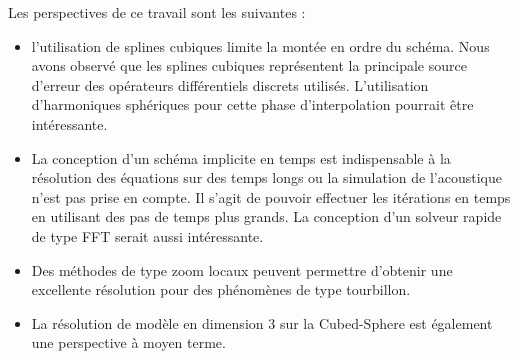 Les perspectives de ce travail sont les suivantes :
\begin{itemize}
\item l'utilisation de splines cubiques limite la montée en ordre du schéma. Nous avons observé que les splines cubiques représentent la principale source d'erreur des opérateurs différentiels discrets utilisés. L'utilisation d'harmoniques sphériques pour cette phase d'interpolation pourrait être intéressante.
\item La conception d'un schéma implicite en temps est indispensable à la résolution des équations sur des temps longs ou la simulation de l’acoustique n'est pas prise en compte. Il s'agit de pouvoir effectuer les itérations en temps en utilisant des pas de temps plus grands. La conception d'un solveur rapide de type FFT serait aussi intéressante.
\item Des méthodes de type zoom locaux peuvent permettre d'obtenir une excellente résolution pour des phénomènes de type tourbillon.
\item La résolution de modèle en dimension 3 sur la Cubed-Sphere est également une perspective à moyen terme.
\end{itemize}

